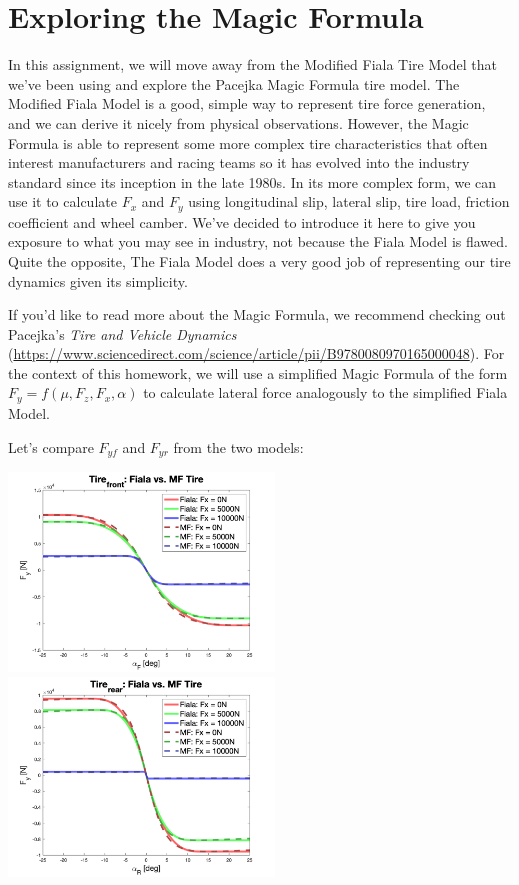 \section*{Exploring the Magic Formula}

In this assignment, we will move away from the Modified Fiala Tire Model that we've been using and explore the Pacejka Magic Formula tire model.  The Modified Fiala Model is a good, simple way to represent tire force generation, and we can derive it nicely from physical observations.  However, the Magic Formula is able to represent some more complex tire characteristics that often interest manufacturers and racing teams so it has evolved into the industry standard since its inception in the late 1980s.  In its more complex form, we can use it to calculate $F_x$ and $F_y$ using longitudinal slip, lateral slip, tire load, friction coefficient and wheel camber.  We've decided to introduce it here to give you exposure to what you may see in industry, not because the Fiala Model is flawed.  Quite the opposite, The Fiala Model does a very good job of representing our tire dynamics given its simplicity.

If you'd like to read more about the Magic Formula, we recommend checking out Pacejka's \textit{Tire and Vehicle Dynamics} (\url{https://www.sciencedirect.com/science/article/pii/B9780080970165000048}).  For the context of this homework, we will use a simplified Magic Formula of the form $F_{y} = f(\mu, F_z, F_x, \alpha)$ to calculate lateral force analogously to the simplified Fiala Model. 

Let's compare $F_{yf}$ and $F_{yr}$ from the two models:

\begin{center}
\includegraphics[width=200pt]{Body/FialaVsMF.png}
\includegraphics[width=200pt]{Body/FialaVsMF_rear.png}
\end{center}

